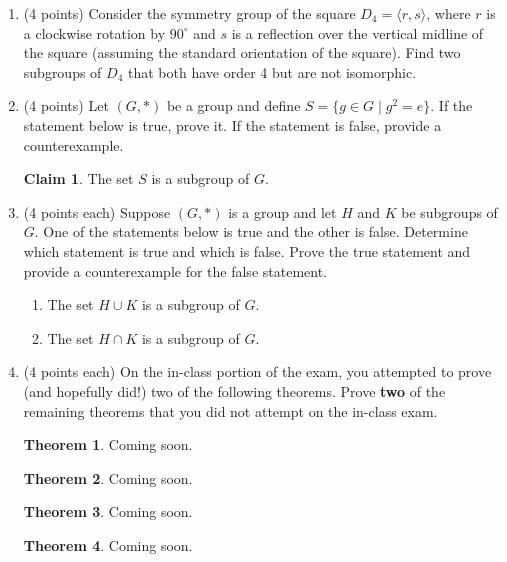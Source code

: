 \documentclass[11pt]{article}
\theoremstyle{definition}
\newtheorem{theorem}{Theorem}
\newtheorem*{claim*}{Claim}
\begin{document}
\begin{enumerate}

\item (4 points) Consider the symmetry group of the square $D_4=\langle r,s\rangle$, where $r$ is a clockwise rotation by $90^{\circ}$ and $s$ is a reflection over the vertical midline of the square (assuming the standard orientation of the square).  Find two subgroups of $D_4$ that both have order 4 but are not isomorphic.

\item (4 points) Let $(G,*)$ be a group and define $S=\{g\in G\mid g^2=e\}$.  If the statement below is true, prove it.  If the statement is false, provide a counterexample.

\begin{claim*}
The set $S$ is a subgroup of $G$.
\end{claim*}

\item (4 points each) Suppose $(G,*)$ is a group and let $H$ and $K$ be subgroups of $G$. One of the statements below is true and the other is false. Determine which statement is true and which is false. Prove the true statement and provide a counterexample for the false statement.  

\begin{enumerate}
\item The set $H\cup K$ is a subgroup of $G$.
\item The set $H\cap K$ is a subgroup of $G$.
\end{enumerate}

\item (4 points each) On the in-class portion of the exam, you attempted to prove (and hopefully did!) two of the following theorems.  Prove \textbf{two} of the remaining theorems that you did not attempt on the in-class exam.

\begin{theorem}
Coming soon.
\end{theorem}

\begin{theorem}
Coming soon.
\end{theorem}

\begin{theorem}
Coming soon.
\end{theorem}

\begin{theorem}
Coming soon.
\end{theorem}


\end{enumerate}
\end{document}
